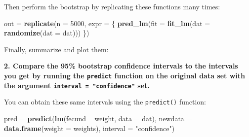 \documentclass[]{book}
\newenvironment{Shaded}{\begin{snugshade}}{\end{snugshade}}
\newcommand{\KeywordTok}[1]{\textcolor[rgb]{0.13,0.29,0.53}{\textbf{#1}}}
\newcommand{\DataTypeTok}[1]{\textcolor[rgb]{0.13,0.29,0.53}{#1}}
\newcommand{\DecValTok}[1]{\textcolor[rgb]{0.00,0.00,0.81}{#1}}
\newcommand{\FloatTok}[1]{\textcolor[rgb]{0.00,0.00,0.81}{#1}}
\newcommand{\StringTok}[1]{\textcolor[rgb]{0.31,0.60,0.02}{#1}}
\newcommand{\ControlFlowTok}[1]{\textcolor[rgb]{0.13,0.29,0.53}{\textbf{#1}}}
\newcommand{\OperatorTok}[1]{\textcolor[rgb]{0.81,0.36,0.00}{\textbf{#1}}}
\newcommand{\NormalTok}[1]{#1}
\theoremstyle{definition}
\theoremstyle{definition}
\theoremstyle{definition}
\theoremstyle{remark}
\begin{document}
Then perform the bootstrap by replicating these functions many times:

\begin{Shaded}
\begin{Highlighting}[]
\NormalTok{out =}\StringTok{ }\KeywordTok{replicate}\NormalTok{(}\DataTypeTok{n =} \DecValTok{5000}\NormalTok{, }\DataTypeTok{expr =}\NormalTok{ \{}
  \KeywordTok{pred_lm}\NormalTok{(}\DataTypeTok{fit =} \KeywordTok{fit_lm}\NormalTok{(}\DataTypeTok{dat =} \KeywordTok{randomize}\NormalTok{(}\DataTypeTok{dat =}\NormalTok{ dat)))}
\NormalTok{\})}
\end{Highlighting}
\end{Shaded}

Finally, summarize and plot them:

\begin{Shaded}
\end{Shaded}

\textbf{2. Compare the 95\% bootstrap confidence intervals to the
intervals you get by running the \texttt{predict} function on the
original data set with the argument \texttt{interval\ =\ "confidence"}
set.}

You can obtain these same intervals using the \texttt{predict()}
function:

\begin{Shaded}
\begin{Highlighting}[]
\NormalTok{pred =}\StringTok{ }\KeywordTok{predict}\NormalTok{(}\KeywordTok{lm}\NormalTok{(fecund }\OperatorTok{~}\StringTok{ }\NormalTok{weight, }\DataTypeTok{data =}\NormalTok{ dat),}
               \DataTypeTok{newdata =} \KeywordTok{data.frame}\NormalTok{(}\DataTypeTok{weight =}\NormalTok{ weights),}
               \DataTypeTok{interval =} \StringTok{"confidence"}\NormalTok{)}
\end{Highlighting}
\end{Shaded}
\end{document}
